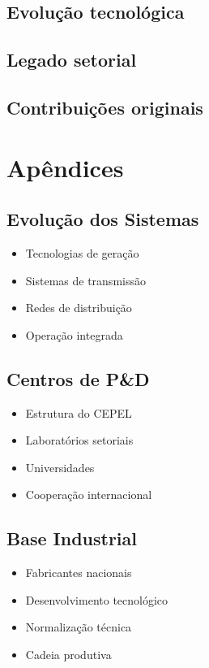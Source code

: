 \documentclass[12pt,a4paper]{report}
\begin{document}
\section{Evolução tecnológica}
\section{Legado setorial}
\section{Contribuições originais}

\chapter{Apêndices}

\section{Evolução dos Sistemas}
\begin{itemize}[leftmargin=*]
    \item Tecnologias de geração
    \item Sistemas de transmissão
    \item Redes de distribuição
    \item Operação integrada
\end{itemize}

\section{Centros de P\&D}
\begin{itemize}[leftmargin=*]
    \item Estrutura do CEPEL
    \item Laboratórios setoriais
    \item Universidades
    \item Cooperação internacional
\end{itemize}

\section{Base Industrial}
\begin{itemize}[leftmargin=*]
    \item Fabricantes nacionais
    \item Desenvolvimento tecnológico
    \item Normalização técnica
    \item Cadeia produtiva
\end{itemize}
\end{document}
